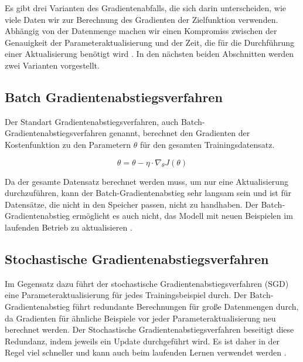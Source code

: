 

    Es gibt drei Varianten des Gradientenabfalls, die sich darin unterscheiden, wie viele Daten wir zur Berechnung des Gradienten der Zielfunktion verwenden. Abhängig von der Datenmenge machen wir einen Kompromiss zwischen der Genauigkeit der Parameteraktualisierung und der Zeit, die für die Durchführung einer Aktualisierung benötigt wird \cite*{Ruder2016}. In den nächsten beiden Abschnitten werden zwei Varianten vorgestellt.

    \subsection{Batch Gradientenabstiegsverfahren}
    Der Standart Gradientenabstiegsverfahren, auch Batch-Gradientenabstiegsverfahren genannt, berechnet den Gradienten der Kostenfunktion zu den Parametern $\theta$ für den gesamten Trainingsdatensatz.


    \begin{equation} \label{FormelGradBatch}
      \theta = \theta - \eta \cdot \nabla_{\theta}J(\theta)
    \end{equation}

    Da der gesamte Datensatz berechnet werden muss, um nur eine Aktualisierung durchzuführen, kann der Batch-Gradientenabstieg sehr langsam sein und ist für Datensätze, die nicht in den Speicher passen, nicht zu handhaben. Der Batch-Gradientenabstieg ermöglicht es auch nicht, das Modell mit neuen Beispielen im laufenden Betrieb zu aktualisieren \cite*{Ruder2016}.

    \subsection{Stochastische Gradientenabstiegsverfahren}

    Im Gegensatz dazu führt der stochastische Gradientenabstiegsverfahren (SGD) eine Parameteraktualisierung für jedes Trainingsbeispiel durch. Der Batch-Gradientenabstieg führt redundante Berechnungen für große Datenmengen durch, da Gradienten für ähnliche Beispiele vor jeder Parameteraktualisierung neu berechnet werden. Der Stochastische Gradientenabstiegsverfahren beseitigt diese Redundanz, indem jeweils ein Update durchgeführt wird. Es ist daher in der Regel viel schneller und kann auch beim laufenden Lernen verwendet werden \cite*{Ruder2016}.

